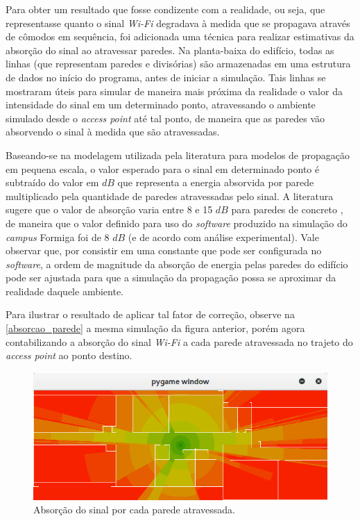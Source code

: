 \documentclass[
	12pt,				%
	twoside,			%
	a4paper,			%
	english,			%
	french,				%
	spanish,			%
	brazil				%
	]{abntex2}
\begin{document}
Para obter um resultado que fosse condizente com a realidade, ou seja,
que representasse quanto o sinal \emph{Wi-Fi} degradava à medida que se
propagava através de cômodos em sequência, foi adicionada uma técnica
para realizar estimativas da absorção do sinal ao atravessar paredes. Na
planta-baixa do edifício, todas as linhas (que representam paredes e
divisórias) são armazenadas em uma estrutura de dados no início do
programa, antes de iniciar a simulação. Tais linhas se mostraram úteis
para simular de maneira mais próxima da realidade o valor da intensidade
do sinal em um determinado ponto, atravessando o ambiente simulado desde
o \emph{access point} até tal ponto, de maneira que as paredes vão
absorvendo o sinal à medida que são atravessadas.

Baseando-se na modelagem utilizada pela literatura para modelos de
propagação em pequena escala, o valor esperado para o sinal em
determinado ponto é subtraído do valor em \(dB\) que representa a
energia absorvida por parede multiplicado pela quantidade de paredes
atravessadas pelo sinal. A literatura sugere que o valor de absorção
varia entre 8 e 15 \(dB\) para paredes de concreto \cite{RAPPAPORT}, de
maneira que o valor definido para uso do \emph{software} produzido na
simulação do \emph{campus} Formiga foi de 8 \(dB\) (e de acordo com
análise experimental). Vale observar que, por consistir em uma constante
que pode ser configurada no \emph{software}, a ordem de magnitude da
absorção de energia pelas paredes do edifício pode ser ajustada para que
a simulação da propagação possa se aproximar da realidade daquele
ambiente.

Para ilustrar o resultado de aplicar tal fator de correção, observe na
\autoref{absorcao_parede} a mesma simulação da figura anterior, porém
agora contabilizando a absorção do sinal \emph{Wi-Fi} a cada parede
atravessada no trajeto do \emph{access point} ao ponto destino.

\begin{figure}[ht]
    \caption{\label{absorcao_parede} Absorção do sinal por cada parede atravessada.}
    \begin{center}
        \includegraphics[scale=0.7]{imagens/absorcao-parede.jpg}
    \end{center}
\end{figure}
\end{document}
